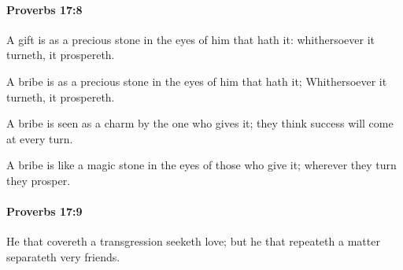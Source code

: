 		\paragraph{Proverbs 17:8} %
			\label{PROVERBS-17-8}

			A gift is as a precious stone in the eyes of him that hath it: whithersoever it turneth, it prospereth.

			\begin{versebox}
					\item[BHS] 
					\item[ASV] A bribe is as a precious stone in the eyes of him that hath it; Whithersoever it turneth, it prospereth.
					\item[NIV] A bribe is seen as a charm by the one who gives it; they think success will come at every turn.
					\item[NRSV] A bribe is like a magic stone in the eyes of those who give it; wherever they turn they prosper.
			\end{versebox}

		\paragraph{Proverbs 17:9} %
			\label{PROVERBS-17-9}

			He that covereth a transgression seeketh love; but he that repeateth a matter separateth very friends.

